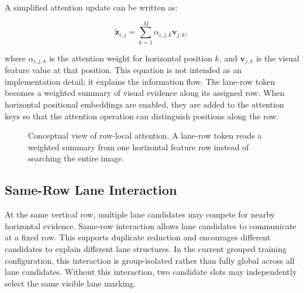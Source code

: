 \documentclass[conference]{IEEEtran}
\begin{document}
A simplified attention update can be written as:

\begin{equation}
    \tilde{\mathbf{z}}_{i,j}
    =
    \sum_{k=1}^{M}
    \alpha_{i,j,k}\mathbf{v}_{j,k},
\end{equation}

where $\alpha_{i,j,k}$ is the attention weight for horizontal position $k$, and $\mathbf{v}_{j,k}$ is the visual feature value at that position. This equation is not intended as an implementation detail; it explains the information flow. The lane-row token becomes a weighted summary of visual evidence along its assigned row. When horizontal positional embeddings are enabled, they are added to the attention keys so that the attention operation can distinguish positions along the row.

\begin{figure}[t]
\centering
{}
\caption{Conceptual view of row-local attention. A lane-row token reads a weighted summary from one horizontal feature row instead of searching the entire image.}
\label{fig:rowlocal}
\end{figure}

\subsection{Same-Row Lane Interaction}

At the same vertical row, multiple lane candidates may compete for nearby horizontal evidence. Same-row interaction allows lane candidates to communicate at a fixed row. This supports duplicate reduction and encourages different candidates to explain different lane structures. In the current grouped training configuration, this interaction is group-isolated rather than fully global across all lane candidates. Without this interaction, two candidate slots may independently select the same visible lane marking.
\end{document}
